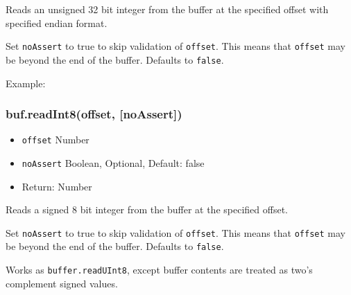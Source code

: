 Reads an unsigned 32 bit integer from the buffer at the specified offset
with specified endian format.

Set \texttt{noAssert} to true to skip validation of \texttt{offset}.
This means that \texttt{offset} may be beyond the end of the buffer.
Defaults to \texttt{false}.

Example:

\begin{Shaded}
\begin{Highlighting}[]
  \NormalTok{);}

\NormalTok{buf[}\NormalTok{] = }\NormalTok{;}
\NormalTok{buf[}\NormalTok{] = }\NormalTok{;}
\NormalTok{buf[}\NormalTok{] = }\NormalTok{;}
\NormalTok{buf[}\NormalTok{] = }\NormalTok{;}

\NormalTok{(}\NormalTok{(}\NormalTok{));}
\NormalTok{(}\NormalTok{(}\NormalTok{));}

\end{Highlighting}
\end{Shaded}

\subsubsection{buf.readInt8(offset, {[}noAssert{]})}

\begin{itemize}
\item
  \texttt{offset} Number
\item
  \texttt{noAssert} Boolean, Optional, Default: false
\item
  Return: Number
\end{itemize}

Reads a signed 8 bit integer from the buffer at the specified offset.

Set \texttt{noAssert} to true to skip validation of \texttt{offset}.
This means that \texttt{offset} may be beyond the end of the buffer.
Defaults to \texttt{false}.

Works as \texttt{buffer.readUInt8}, except buffer contents are treated
as two's complement signed values.

